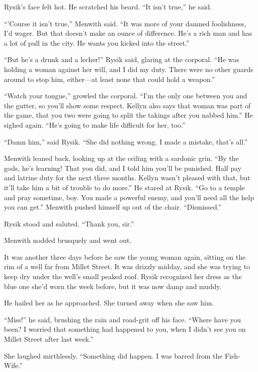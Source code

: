 \documentclass[10pt,a4paper]{article}
\begin{document}
Rysik's face felt hot. He scratched his beard. ``It isn't true,''
he said.

``'Course it isn't true,'' Menwith said. ``It was more of your damned
foolishness, I'd wager. But that doesn't make an ounce of difference.
He's a rich man and has a lot of pull in the city. He wants you
kicked into the street.''

``But he's a drunk and a lecher!'' Rysik said, glaring at the
corporal. ``He was holding a woman against her will, and I did my
duty. There were no other guards around to stop him, either---at
least none that could hold a weapon.''

``Watch your tongue,'' growled the corporal. ``I'm the only one between
you and the gutter, so you'll show some respect. Kellyn also says
that woman was part of the game, that you two were going to split
the takings after you nabbed him.'' He sighed again. ``He's going to
make life difficult for her, too.''

``Damn him,'' said Rysik. ``She did nothing wrong. I made a mistake,
that's all.''

Menwith leaned back, looking up at the ceiling with a sardonic grin.
``By the gods, he's learning! That you did, and I told him you'll be
punished. Half pay and latrine duty for the next three months. Kellyn
wasn't pleased with that, but it'll take him a bit of trouble to
do more.'' He stared at Rysik. ``Go to a temple and pray sometime,
boy. You made a powerful enemy, and you'll need all the help you
can get.'' Menwith pushed himself up out of the chair. ``Dismissed.''

Rysik stood and saluted. ``Thank you, sir.''

Menwith nodded brusquely and went out.

\bigskip

It was another three days before he saw the young woman again,
sitting on the rim of a well far from Millet Street. It was drizzly
midday, and she was trying to keep dry under the well's small peaked
roof. Rysik recognized her dress as the blue one she'd worn the
week before, but it was now damp and muddy.

He hailed her as he approached. She turned away when she saw him.

``Miss!'' he said, brushing the rain and road-grit off his face. ``Where
have you been? I worried that something had happened to you, when
I didn't see you on Millet Street after last week.''

She laughed mirthlessly. ``Something did happen. I was barred from
the Fish-Wife.''
\end{document}
